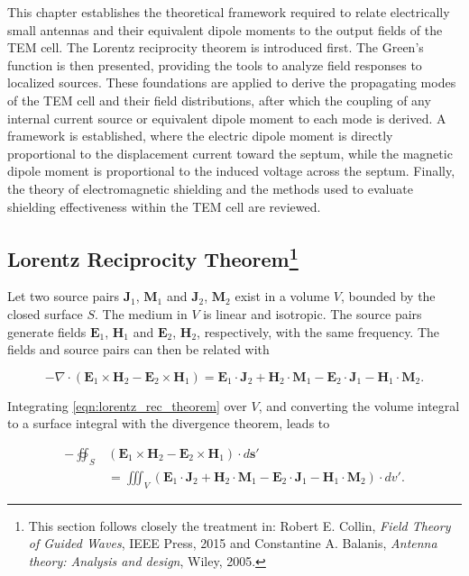 This chapter establishes the theoretical framework required to relate 
electrically small antennas and their equivalent dipole moments to 
the output fields of the TEM cell. The Lorentz reciprocity theorem 
is introduced first. The Green's function is then 
presented, providing the tools to analyze field responses to 
localized sources. These foundations are applied to derive the 
propagating modes of the TEM cell and their field distributions, 
after which the coupling of any internal current source 
or equivalent dipole moment to each mode is derived. A framework is established, where the electric dipole moment is directly 
proportional to the displacement current toward the septum, while 
the magnetic dipole moment is proportional to the induced voltage across 
the septum. Finally, the theory of electromagnetic shielding and the 
methods used to evaluate shielding effectiveness within the TEM cell 
are reviewed.

\subsection[Lorentz Reciprocity Theorem]{Lorentz Reciprocity Theorem\protect\footnote{This section follows closely the treatment in: Robert E. Collin, \textit{Field Theory of Guided Waves}, IEEE Press, 2015 and Constantine A. Balanis, \textit{Antenna theory: Analysis and design}, Wiley, 2005.}}\label{sec:lorentz_theorem}


Let two source pairs $\mathbf{J}_1$, $\mathbf{M}_1$ and $\mathbf{J}_2$, $\mathbf{M}_2$ exist in a volume $V$, bounded by the closed surface $S$. The medium in $V$ is linear and isotropic. The source pairs generate fields $\mathbf{E}_1$, $\mathbf{H}_1$ and $\mathbf{E}_2$, $\mathbf{H}_2$, respectively, with the same frequency. The fields and source pairs can then be related with \cites[p.~145]{Balanis_1997}[p. 49]{Collin_2015}

\begin{equation}
	-\nabla \cdot (\mathbf{E}_1\times \mathbf{H}_2-\mathbf{E}_2\times \mathbf{H}_1)=\mathbf{E}_1\cdot \mathbf{J}_2+\mathbf{H}_2\cdot \mathbf{M}_1-\mathbf{E}_2\cdot \mathbf{J}_1-\mathbf{H}_1\cdot \mathbf{M}_2.
	\label{eqn:lorentz_rec_theorem}
\end{equation}

Integrating \autoref{eqn:lorentz_rec_theorem} over $V$, and converting the volume integral to a surface integral with the divergence theorem, leads to \cites[p. 145]{Balanis_1997}[p. 50]{Collin_2015}

\begin{align}
    -\oiint_S &(\mathbf{E}_1\times \mathbf{H}_2-\mathbf{E}_2\times \mathbf{H}_1)\cdot d\mathbf{s}'\nonumber\\&=\iiint_V
\left(\mathbf{E}_1\cdot \mathbf{J}_2+\mathbf{H}_2\cdot \mathbf{M}_1-\mathbf{E}_2\cdot \mathbf{J}_1-\mathbf{H}_1\cdot \mathbf{M}_2\right)\cdot dv'.
    \label{eqn:lorentz_rec_theorem_int}
\end{align}

